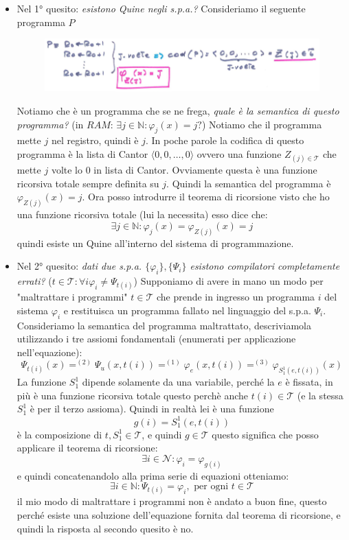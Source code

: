 \documentclass{article}
\begin{document}
\begin{itemize}
    \item Nel 1° quesito: \textit{esistono Quine negli s.p.a.?} Consideriamo il seguente
          programma $P$
          \begin{figure}
              \centering
              \includegraphics[scale=0.5]{images/P_teoremaric.png}
          \end{figure}
          Notiamo che è un programma che se ne frega, \textit{quale è la semantica di questo
              programma?} (in $RAM$: $\exists j\in\mathbb{N}:\varphi_j(x)=j?$) Notiamo che il programma mette $j$ nel registro, quindi è $j$.
          In poche parole la codifica di questo programma è la lista di Cantor $\langle0,0,\dots, 0\rangle$
          ovvero una funzione $Z_{(j)\in\mathcal{T}}$ che mette $j$ volte lo 0 in lista di Cantor. Ovviamente
          questa è una funzione ricorsiva totale sempre definita su $j$.
          Quindi la semantica del programma è $\varphi_{Z(j)}(x)=j$.
          Ora posso introdurre il teorema di ricorsione visto che ho una funzione ricorsiva totale (lui
          la necessita) esso dice che:
          $$\exists j\in\mathbb{N}:\varphi_j(x)=\varphi_{Z(j)}(x)=j$$
          quindi esiste un Quine all'interno del sistema di programmazione.

    \item Nel 2° quesito: \textit{dati due s.p.a. $\{\varphi_i\},\{\Psi_i\}$ esistono compilatori completamente errati?}
          ($t\in\mathcal{T}:\forall i \varphi_i\neq\Psi_{t(i)}$) Supponiamo di avere in mano un modo
          per "maltrattare i programmi" $t\in\mathcal{T}$ che prende in ingresso un programma $i$ del sistema $\varphi_i$
          e restituisca un programma fallato nel linguaggio del s.p.a. $\Psi_i$.
          Consideriamo la semantica del programma maltrattato, descriviamola utilizzando
          i tre assiomi fondamentali (enumerati per applicazione nell'equazione):
          $$\Psi_{t(i)}(x)=^{(2)}\Psi_u(x,t(i))=^{(1)}\varphi_e(x,t(i))=^{(3)}\varphi_{S_1^1(e,t(i))}(x)$$
          La funzione $S_1^1$ dipende solamente da una variabile, perché la $e$ è fissata, in più è
          una funzione ricorsiva totale questo perchè anche $t(i)\in\mathcal{T}$ (e la stessa $S_1^1$ è per
          il terzo assioma). Quindi in realtà lei è una funzione
          $$g(i)=S_1^1(e,t(i))$$ è la composizione di $t,S_1^1\in\mathcal{T}$, e quindi $g\in\mathcal{T}$
          questo significa che posso applicare il teorema di ricorsione:
          $$\exists i\in\mathcal{N}:\varphi_i=\varphi_{g(i)}$$
          e quindi concatenandolo alla prima serie di equazioni otteniamo:
          $$\exists i\in\mathbb{N}:\Psi_{t(i)}=\varphi_i,\text{ per ogni }t\in\mathcal{T}$$
          il mio modo di maltrattare i programmi non è andato a buon fine, questo perché esiste
          una soluzione dell'equazione fornita dal teorema di ricorsione, e quindi la risposta al
          secondo quesito è no.
\end{itemize}
\end{document}
